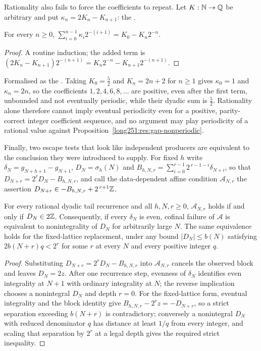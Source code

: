 \documentclass[11pt]{article}
\begin{document}
Rationality also fails to force the coefficients to repeat.  Let $K:\mathbb{N}\to\mathbb{Q}$ be
arbitrary and put $\kappa_n=2K_n-K_{n+1}$: the
.

\begin{proposition}\label{long251:res:telescope}
For every $n\ge0$,
$\sum_{i=0}^{n-1}\kappa_i2^{-(i+1)}=K_0-K_n2^{-n}$.
\end{proposition}

\begin{proof}
A routine induction; the added term is
$(2K_n-K_{n+1})2^{-(n+1)}=K_n2^{-n}-K_{n+1}2^{-(n+1)}$.
\end{proof}

\noindent Formalised as the
.  Taking $K_0=\tfrac52$ and $K_n=2n+2$ for $n\ge1$ gives
$\kappa_0=1$ and $\kappa_n=2n$, so the coefficients $1,2,4,6,8,\ldots$ are
positive, even after the first term, unbounded and not eventually periodic,
while their dyadic sum is $\tfrac52$.  Rationality alone therefore cannot imply
eventual periodicity even for a positive, parity-correct integer coefficient
sequence, and no argument may play periodicity of a rational value against
Proposition~\ref{long251:res:gap-nonperiodic}.

Finally, two escape tests that look like independent producers are equivalent
to the conclusion they were introduced to supply.  For fixed $h$ write
$\delta_N=g_{N+h+1}-g_{N+1}$, $D_N=\sigma_h(N)$ and
$B_{h,N,r}=\sum_{i=0}^{r-1}2^{\,r-1-i}\delta_{N+i}$, so that
$D_{N+r}=2^{r}D_N-B_{h,N,r}$, and call the data-dependent affine condition
$\mathcal A_{N,r}$ the assertion $D_{N+r}\in-B_{h,N,r}+2^{\,r+1}\mathbb{Z}$.

\begin{theorem}\label{long251:res:affinecollapse}
For every rational dyadic tail recurrence and all $h,N,r\ge0$,
$\mathcal A_{N,r}$ holds if and only if $D_N\in2\mathbb{Z}$.  Consequently, if every
$\delta_N$ is even, cofinal failure of $\mathcal A$ is equivalent to
nonintegrality of $D_N$ for arbitrarily large $N$.  The same equivalence holds
for the fixed-lattice replacement, under any bound $|D_N|\le b(N)$ satisfying
$2b(N+r)q<2^{r}$ for some $r$ at every $N$ and every positive integer $q$.
\end{theorem}

\begin{proof}
Substituting $D_{N+r}=2^{r}D_N-B_{h,N,r}$ into $\mathcal A_{N,r}$ cancels the
observed block and leaves $D_N=2z$.  After one recurrence step, evenness of
$\delta_N$ identifies even integrality at $N+1$ with ordinary integrality at
$N$; the reverse implication chooses a nonintegral $D_N$ and depth $r=0$.  For
the fixed-lattice form, eventual integrality and the block identity give
$B_{h,N,r}-2^{r}z=-D_{N+r}$, so a strict separation exceeding $b(N+r)$ is
contradictory; conversely a nonintegral $D_N$ with reduced denominator $q$ has
distance at least $1/q$ from every integer, and scaling that separation by
$2^{r}$ at a legal depth gives the required strict inequality.
\end{proof}
\end{document}
